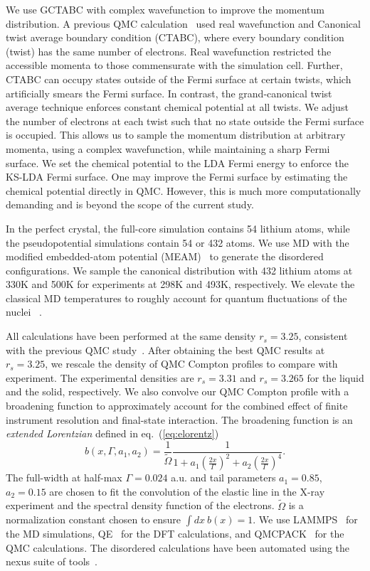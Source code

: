 \documentclass[aps,prb,showpacs,preprintnumbers,amsmath,amssymb,superscriptaddress,twocolumn]{revtex4-1}
\begin{document}
We use GCTABC with complex wavefunction to improve the momentum distribution. A previous QMC calculation~\cite{Filippi1999} used real wavefunction and Canonical twist average boundary condition (CTABC), where every boundary condition (twist) has the same number of electrons. Real wavefunction restricted the accessible momenta to those commensurate with the simulation cell. Further, CTABC can occupy states outside of the Fermi surface at certain twists, which artificially smears the Fermi surface. In contrast, the grand-canonical twist average technique enforces constant chemical potential at all twists. We adjust the number of electrons at each twist such that no state outside the Fermi surface is occupied. This allows us to sample the momentum distribution at arbitrary momenta, using a complex wavefunction, while maintaining a sharp Fermi surface. We set the chemical potential to the LDA Fermi energy to enforce the KS-LDA Fermi surface. One may improve the Fermi surface by estimating the chemical potential directly in QMC. However, this is much more computationally demanding and is beyond the scope of the current study.

In the perfect crystal, the full-core simulation contains 54 lithium atoms, while the pseudopotential simulations contain 54 or 432 atoms. We use MD with the modified embedded-atom potential (MEAM)~\cite{Baskes1992} to generate the disordered configurations. We sample the canonical distribution with 432 lithium atoms at 330K and 500K for experiments at 298K and 493K, respectively. We elevate the classical MD temperatures to roughly account for quantum fluctuations of the nuclei ~\cite{Filippi1998}.

All calculations have been performed at the same density $r_s=3.25$, consistent with the previous QMC study~\cite{Filippi1999}. After obtaining the best QMC results at $r_s=3.25$, we rescale the density of QMC Compton profiles to compare with experiment. The experimental densities are $r_s=3.31$ and $r_s=3.265$ for the liquid and the solid, respectively. We also convolve our QMC Compton profile with a broadening function to approximately account for the combined effect of finite instrument resolution and final-state interaction. The broadening function is an \emph{extended Lorentzian} defined in eq.~(\ref{eq:elorentz})
\begin{equation}
b(x,\Gamma,a_1, a_2) = \frac{1}{\tilde{\Omega}} \frac{1}{
1+a_1(\frac{2x}{\Gamma})^2+a_2(\frac{2x}{\Gamma})^4
}.\label{eq:elorentz}
\end{equation}
The full-width at half-max $\Gamma=0.024$ a.u. and tail parameters $a_1=0.85$, $a_2=0.15$ are chosen to fit the convolution of the elastic line in the X-ray experiment and the spectral density function of the electrons. $\tilde{\Omega}$ is a normalization constant chosen to ensure $\int dx ~b(x)=1$. We use LAMMPS~\cite{Plimpton1993} for the MD simulations, QE~\cite{Giannozzi2009,Enkovaara2017} for the DFT calculations, and QMCPACK~\cite{Kim2018} for the QMC calculations. The disordered calculations have been automated using the nexus suite of tools~\cite{Krogel2016}.
\end{document}
